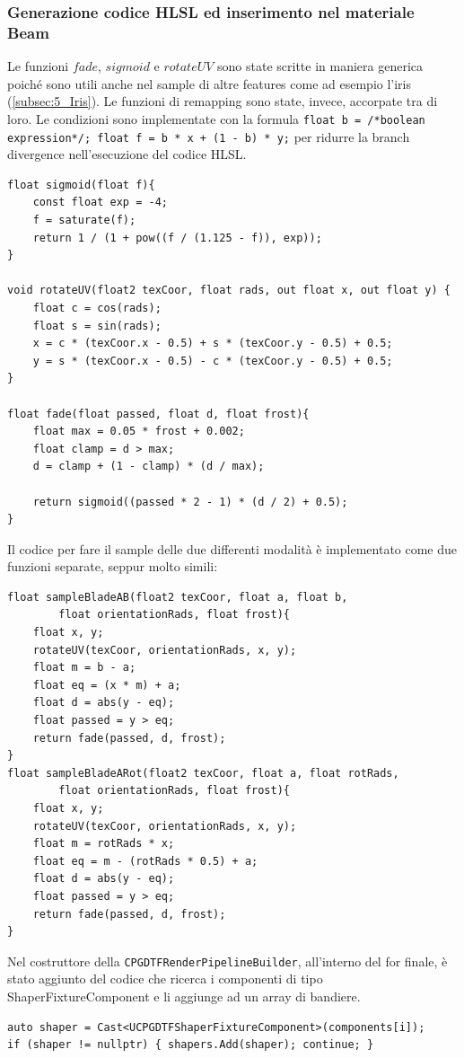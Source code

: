 \documentclass[main.tex]{subfiles}
\begin{document}
\subsubsection{Generazione codice HLSL ed inserimento nel materiale Beam}\label{subsec:5_1_ShaperHlsl}
\lstset{language=glsl}
Le funzioni $fade$, $sigmoid$ e $rotateUV$ sono state scritte in maniera generica poiché sono utili anche nel sample di altre features come ad esempio l'iris (\ref{subsec:5_Iris}). Le funzioni di remapping sono state, invece, accorpate tra di loro. Le condizioni sono implementate con la formula \lstinline{float b = /*boolean expression*/; float f = b * x + (1 - b) * y;} per ridurre la branch divergence nell'esecuzione del codice HLSL.
\begin{lstlisting}
float sigmoid(float f){
	const float exp = -4;
	f = saturate(f);
	return 1 / (1 + pow((f / (1.125 - f)), exp));
}

void rotateUV(float2 texCoor, float rads, out float x, out float y) {
	float c = cos(rads);
	float s = sin(rads);
	x = c * (texCoor.x - 0.5) + s * (texCoor.y - 0.5) + 0.5;
	y = s * (texCoor.x - 0.5) - c * (texCoor.y - 0.5) + 0.5;
}

float fade(float passed, float d, float frost){
	float max = 0.05 * frost + 0.002;
	float clamp = d > max;
	d = clamp + (1 - clamp) * (d / max);

	return sigmoid((passed * 2 - 1) * (d / 2) + 0.5);
}
\end{lstlisting}

Il codice per fare il sample delle due differenti modalità è implementato come due funzioni separate, seppur molto simili:
\begin{lstlisting}
float sampleBladeAB(float2 texCoor, float a, float b,
		float orientationRads, float frost){
	float x, y;
	rotateUV(texCoor, orientationRads, x, y);
	float m = b - a;
	float eq = (x * m) + a;
	float d = abs(y - eq);
	float passed = y > eq;
	return fade(passed, d, frost);
}
float sampleBladeARot(float2 texCoor, float a, float rotRads,
		float orientationRads, float frost){
	float x, y;
	rotateUV(texCoor, orientationRads, x, y);
	float m = rotRads * x;
	float eq = m - (rotRads * 0.5) + a;
	float d = abs(y - eq);
	float passed = y > eq;
	return fade(passed, d, frost);
}
\end{lstlisting}


Nel costruttore della \lstinline{CPGDTFRenderPipelineBuilder}, all'interno del for finale, è stato aggiunto del codice che ricerca i componenti di tipo ShaperFixtureComponent e li aggiunge ad un array di bandiere.
\lstset{language=UEcpp}
\begin{lstlisting}
auto shaper = Cast<UCPGDTFShaperFixtureComponent>(components[i]);
if (shaper != nullptr) { shapers.Add(shaper); continue; }
\end{lstlisting}
\end{document}
